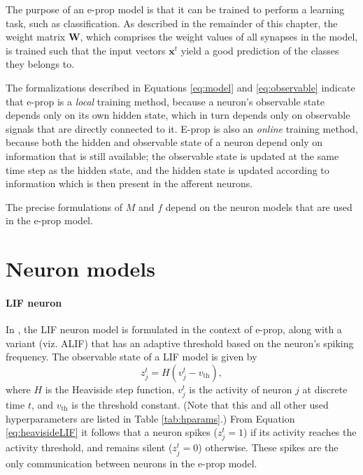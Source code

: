         The purpose of an e-prop model is that it can be trained to perform a learning task, such as classification.
        As described in the remainder of this chapter, the weight matrix $\mathbf{W}$, which comprises the weight values of all synapses in the model, is trained such that the input vectors $\mathbf{x}^t$ yield a good prediction of the classes they belongs to.

        The formalizations described in Equations \ref{eq:model} and \ref{eq:observable} indicate that e-prop is a \emph{local} training method, because a neuron's observable state depends only on its own hidden state, which in turn depends only on observable signals that are directly connected to it.
        E-prop is also an \emph{online} training method, because both the hidden and observable state of a neuron depend only on information that is still available; the observable state is updated at the same time step as the hidden state, and the hidden state is updated according to information which is then present in the afferent neurons.

        The precise formulations of $M$ and $f$ depend on the neuron models that are used in the e-prop model.

    \section{Neuron models}\label{sec:alif}

        \paragraph{LIF neuron}
            In \citet{bellec2020solution}, the LIF neuron model is formulated in the context of e-prop, along with a variant (viz. ALIF) that has an adaptive threshold based on the neuron's spiking frequency.
            The observable state of a LIF model is given by
            \begin{equation}\label{eq:heavisideLIF}
            z^t_j = H\left(v_j^t-v_\text{th}\right),
            \end{equation}
            where $H$ is the Heaviside step function, $v^t_j$ is the activity of neuron $j$ at discrete time $t$, and $v_\text{th}$ is the threshold constant.
            (Note that this and all other used hyperparameters are listed in Table \ref{tab:hparams}.)
            From Equation \ref{eq:heavisideLIF} it follows that a neuron spikes ($z^t_j = 1$) if its activity reaches the activity threshold, and remains silent ($z^t_j = 0$) otherwise.
            These spikes are the only communication between neurons in the e-prop model.

